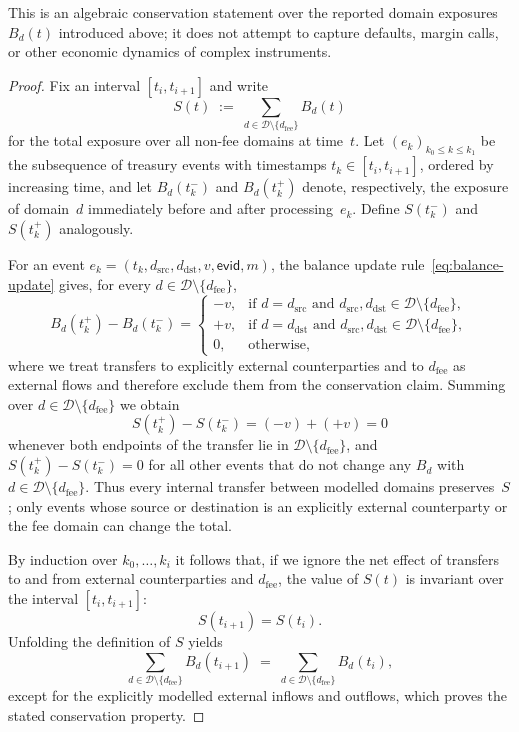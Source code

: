 \documentclass[11pt]{article}
\begin{document}
\noindent
This is an algebraic conservation statement over the reported domain exposures $B_d(t)$ introduced above;
it does not attempt to capture defaults, margin calls, or other economic dynamics of complex instruments.

\begin{proof}
Fix an interval $[t_i,t_{i+1}]$ and write
\[
  S(t) \;:=\; \sum_{d \in \mathcal{D} \setminus \{d_{\mathrm{fee}}\}} B_d(t)
\]
for the total exposure over all non-fee domains at time~$t$.
Let $(e_k)_{k_0 \le k \le k_1}$ be the subsequence of treasury events with timestamps
$t_k \in [t_i,t_{i+1}]$, ordered by increasing time, and let
$B_d(t_k^-)$ and $B_d(t_k^+)$ denote, respectively, the exposure of domain~$d$
immediately before and after processing~$e_k$.
Define $S(t_k^-)$ and $S(t_k^+)$ analogously.

For an event
$e_k = (t_k,d_{\mathrm{src}},d_{\mathrm{dst}},v,\mathsf{evid},m)$,
the balance update rule~\eqref{eq:balance-update} gives, for every
$d \in \mathcal{D} \setminus \{d_{\mathrm{fee}}\}$,
\[
  B_d(t_k^+) - B_d(t_k^-)
  =
  \begin{cases}
    -v, & \text{if } d = d_{\mathrm{src}} \text{ and } d_{\mathrm{src}},d_{\mathrm{dst}} \in \mathcal{D} \setminus \{d_{\mathrm{fee}}\},\\[0.4ex]
    +v, & \text{if } d = d_{\mathrm{dst}} \text{ and } d_{\mathrm{src}},d_{\mathrm{dst}} \in \mathcal{D} \setminus \{d_{\mathrm{fee}}\},\\[0.4ex]
    0,  & \text{otherwise,}
  \end{cases}
\]
where we treat transfers to explicitly external counterparties and to
$d_{\mathrm{fee}}$ as external flows
and therefore exclude them from the conservation claim.
Summing over $d \in \mathcal{D} \setminus \{d_{\mathrm{fee}}\}$ we obtain
\[
  S(t_k^+) - S(t_k^-)
  =
  (-v) + (+v) = 0
\]
whenever both endpoints of the transfer lie in
$\mathcal{D} \setminus \{d_{\mathrm{fee}}\}$,
and $S(t_k^+) - S(t_k^-) = 0$ for all other events that do not change any
$B_d$ with $d \in \mathcal{D} \setminus \{d_{\mathrm{fee}}\}$.
Thus every internal transfer between modelled domains preserves~$S$;
only events whose source or destination is an explicitly external counterparty
or the fee domain can change the total.

By induction over $k_0,\dots,k_i$ it follows that, if we ignore the net effect
of transfers to and from external counterparties and $d_{\mathrm{fee}}$,
the value of $S(t)$ is invariant over the interval $[t_i,t_{i+1}]$:
\[
  S(t_{i+1}) = S(t_i).
\]
Unfolding the definition of $S$ yields
\[
  \sum_{d \in \mathcal{D} \setminus \{d_{\mathrm{fee}}\}} B_d(t_{i+1})
  \;=\;
  \sum_{d \in \mathcal{D} \setminus \{d_{\mathrm{fee}}\}} B_d(t_i),
\]
except for the explicitly modelled external inflows and outflows,
which proves the stated conservation property.
\end{proof}
\end{document}

